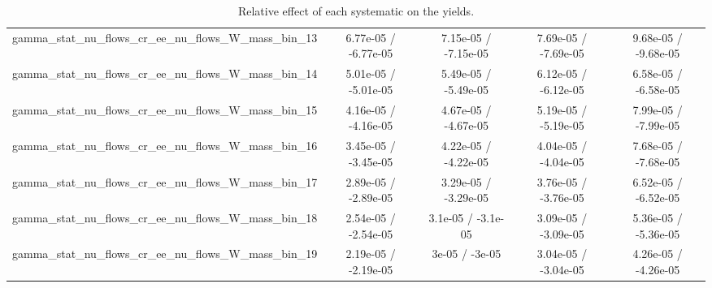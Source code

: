 \documentclass[10pt]{article}
\begin{document}
\begin{table}[htbp]
\begin{center}
\begin{tabular}{|c|c|c|c|c|}
  gamma_stat_nu_flows_cr_ee_nu_flows_W_mass_bin_13 & 6.77e-05 / -6.77e-05 & 7.15e-05 / -7.15e-05 & 7.69e-05 / -7.69e-05 & 9.68e-05 / -9.68e-05 \\ 
  gamma_stat_nu_flows_cr_ee_nu_flows_W_mass_bin_14 & 5.01e-05 / -5.01e-05 & 5.49e-05 / -5.49e-05 & 6.12e-05 / -6.12e-05 & 6.58e-05 / -6.58e-05 \\ 
  gamma_stat_nu_flows_cr_ee_nu_flows_W_mass_bin_15 & 4.16e-05 / -4.16e-05 & 4.67e-05 / -4.67e-05 & 5.19e-05 / -5.19e-05 & 7.99e-05 / -7.99e-05 \\ 
  gamma_stat_nu_flows_cr_ee_nu_flows_W_mass_bin_16 & 3.45e-05 / -3.45e-05 & 4.22e-05 / -4.22e-05 & 4.04e-05 / -4.04e-05 & 7.68e-05 / -7.68e-05 \\ 
  gamma_stat_nu_flows_cr_ee_nu_flows_W_mass_bin_17 & 2.89e-05 / -2.89e-05 & 3.29e-05 / -3.29e-05 & 3.76e-05 / -3.76e-05 & 6.52e-05 / -6.52e-05 \\ 
  gamma_stat_nu_flows_cr_ee_nu_flows_W_mass_bin_18 & 2.54e-05 / -2.54e-05 & 3.1e-05 / -3.1e-05 & 3.09e-05 / -3.09e-05 & 5.36e-05 / -5.36e-05 \\ 
  gamma_stat_nu_flows_cr_ee_nu_flows_W_mass_bin_19 & 2.19e-05 / -2.19e-05 & 3e-05 / -3e-05 & 3.04e-05 / -3.04e-05 & 4.26e-05 / -4.26e-05 \\ 
\hline 
\end{tabular} 
\caption{Relative effect of each systematic on the yields.} 
\end{center} 
\end{table} 
\end{document}
